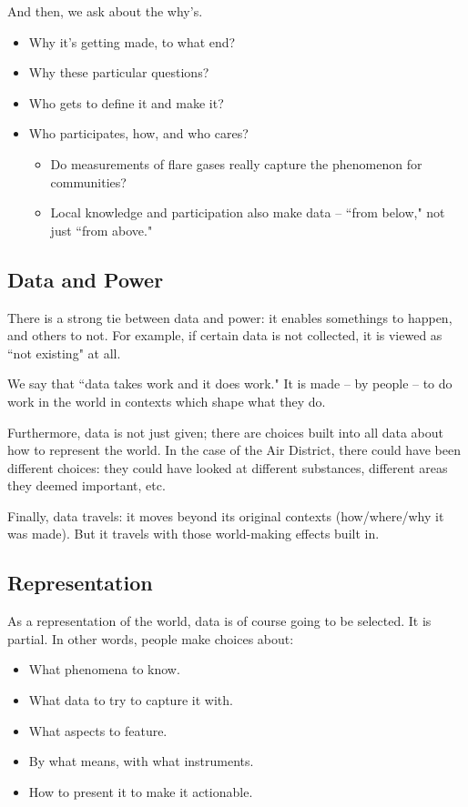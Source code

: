 \documentclass[openany]{book}
\begin{document}
And then, we ask about the why's.
\begin{itemize}
	\item Why it's getting made, to what end?
	\item Why these particular questions?
	\item Who gets to define it and make it?
	\item Who participates, how, and who cares?
	\begin{itemize}
		\item Do measurements of flare gases really capture the phenomenon for communities?
		\item Local knowledge and participation also make data -- ``from below," not just ``from above."
	\end{itemize}
\end{itemize}

\subsection{Data and Power}
There is a strong tie between data and power: it enables somethings to happen, and others to not. For example, if certain data is not collected, it is viewed as ``not existing" at all.

We say that ``data takes work and it does work." It is made -- by people -- to do work in the world in contexts which shape what they do.

Furthermore, data is not just given; there are choices built into all data about how to represent the world. In the case of the Air District, there could have been different choices: they could have looked at different substances, different areas they deemed important, etc.

Finally, data travels: it moves beyond its original contexts (how/where/why it was made). But it travels with those world-making effects built in.

\subsection{Representation}
As a representation of the world, data is of course going to be selected. It is partial. In other words, people make choices about:
\begin{itemize}
	\item What phenomena to know.
	\item What data to try to capture it with.
	\item What aspects to feature.
	\item By what means, with what instruments.
	\item How to present it to make it actionable.
\end{itemize}
\end{document}
